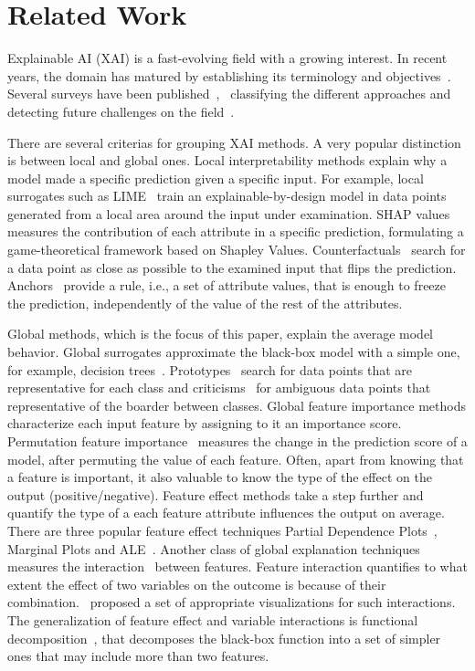 \documentclass[wcp]{jmlr}
\begin{document}
\section{Related Work}
\label{sec:2-related}

Explainable AI (XAI) is a fast-evolving field with a growing
interest. In recent years, the domain has matured by establishing its
terminology and objectives~\citep{Hoffman2018}. Several surveys have
been published~\citep{BarredoArrieta2020},~\citep{Adadi2018} classifying
the different approaches and detecting future challenges on the
field~\citep{Molnar2020}.

There are several criterias for grouping XAI methods. A very popular
distinction is between local and global ones. Local interpretability
methods explain why a model made a specific prediction given a
specific input. For example, local surrogates such as
LIME~\citep{Ribeiro2016} train an explainable-by-design model in data
points generated from a local area around the input under
examination. SHAP values~\citep{Lundberg2017} measures the
contribution of each attribute in a specific prediction, formulating a
game-theoretical framework based on Shapley
Values. Counterfactuals~\citep{Wachter2017} search for a data point as
close as possible to the examined input that flips the
prediction. Anchors~\citep{Ribeiro2018} provide a rule, i.e., a set of
attribute values, that is enough to freeze the prediction,
independently of the value of the rest of the attributes.


Global methods, which is the focus of this paper, explain the average
model behavior. Global surrogates approximate the black-box model with
a simple one, for example, decision
trees~\citep{nanfack2021global}. Prototypes~\citep{Gurumoorthy2019}
search for data points that are representative for each class and
criticisms~\citep{Kim2016} for ambiguous data points that
representative of the boarder between classes. Global feature
importance methods characterize each input feature by assigning to it
an importance score. Permutation feature importance~\citep{Fisher2019}
measures the change in the prediction score of a model, after
permuting the value of each feature. Often, apart from knowing that a
feature is important, it also valuable to know the type of the effect
on the output (positive/negative). Feature effect methods take a step
further and quantify the type of a each feature attribute influences
the output on average. There are three popular feature effect
techniques Partial Dependence Plots~\citep{Friedman2001}, Marginal
Plots and ALE~\citep{Apley2020}. Another class of global explanation
techniques measures the interaction~\citep{Friedman2008} between
features. Feature interaction quantifies to what extent the effect of
two variables on the outcome is because of their
combination.~\cite{Friedman2008} proposed a set of appropriate
visualizations for such interactions. The generalization of feature
effect and variable interactions is functional
decomposition~\citep{Molnar2021}, that decomposes the black-box
function into a set of simpler ones that may include more than two
features.
\end{document}
